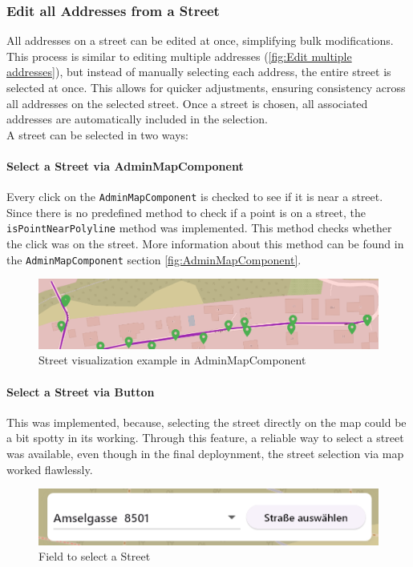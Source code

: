 \subsubsection{Edit all Addresses from a Street}
All addresses on a street can be edited at once, simplifying bulk modifications. This process is similar to editing multiple addresses (\ref{fig:Edit multiple addresses}), but instead of manually selecting each address, the entire street is selected at once. This allows for quicker adjustments, ensuring consistency across all addresses on the selected street. Once a street is chosen, all associated addresses are automatically included in the selection. \\

A street can be selected in two ways:  




\paragraph{Select a Street via AdminMapComponent}
Every click on the \texttt{AdminMapComponent} is checked to see if it is near a street. Since there is no predefined method to check if a point is on a street, the \texttt{isPointNearPolyline} method was implemented. This method checks whether the click was on the street. More information about this method can be found in the \texttt{AdminMapComponent} section \ref{fig:AdminMapComponent}.\

\begin{figure}[H]
    \centering
    \includegraphics[width=0.6\linewidth]{images/AdminPanel/Street.png}
    \caption{Street visualization example in AdminMapComponent}
\end{figure}


\paragraph{Select a Street via Button}
This was implemented, because, selecting the street directly on the map could be a bit spotty in its working. Through this feature, a reliable way to select a street was available, even though in the final deploynment, the street selection via map worked flawlessly. 
\begin{figure}[H]
    \centering
    \includegraphics[width=0.6\linewidth]{images/AdminPanel/SelectStreetButton.png}
    \caption{Field to select a Street}
\end{figure}


